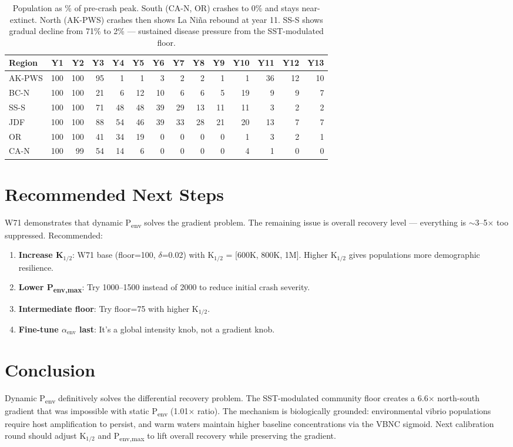 \documentclass[11pt]{article}
\begin{document}
\begin{table}[H]
\centering
\small
\begin{tabular}{l|rrrrrrrrrrrrr}
\toprule
Region & Y1 & Y2 & Y3 & Y4 & Y5 & Y6 & Y7 & Y8 & Y9 & Y10 & Y11 & Y12 & Y13 \\
\midrule
AK-PWS & 100 & 100 & 95 & 1 & 1 & 3 & 2 & 2 & 1 & 1 & 36 & 12 & 10 \\
BC-N & 100 & 100 & 21 & 6 & 12 & 10 & 6 & 6 & 5 & 19 & 9 & 9 & 7 \\
SS-S & 100 & 100 & 71 & 48 & 48 & 39 & 29 & 13 & 11 & 11 & 3 & 2 & 2 \\
JDF & 100 & 100 & 88 & 54 & 46 & 39 & 33 & 28 & 21 & 20 & 13 & 7 & 7 \\
OR & 100 & 100 & 41 & 34 & 19 & 0 & 0 & 0 & 0 & 1 & 3 & 2 & 1 \\
CA-N & 100 & 99 & 54 & 14 & 6 & 0 & 0 & 0 & 0 & 4 & 1 & 0 & 0 \\
\bottomrule
\end{tabular}
\caption{Population as \% of pre-crash peak. South (CA-N, OR) crashes to 0\% and stays near-extinct. North (AK-PWS) crashes then shows La Ni\~na rebound at year 11. SS-S shows gradual decline from 71\% to 2\% --- sustained disease pressure from the SST-modulated floor.}
\end{table}

\section{Recommended Next Steps}

W71 demonstrates that dynamic P\textsubscript{env} solves the gradient problem. The remaining issue is overall recovery level --- everything is $\sim$3--5$\times$ too suppressed. Recommended:

\begin{enumerate}
    \item \textbf{Increase K$_{1/2}$}: W71 base (floor=100, $\delta$=0.02) with K$_{1/2}$ = [600K, 800K, 1M]. Higher K$_{1/2}$ gives populations more demographic resilience.
    \item \textbf{Lower P\textsubscript{env,max}}: Try 1000--1500 instead of 2000 to reduce initial crash severity.
    \item \textbf{Intermediate floor}: Try floor=75 with higher K$_{1/2}$.
    \item \textbf{Fine-tune $\alpha_\text{env}$ last}: It's a global intensity knob, not a gradient knob.
\end{enumerate}

\section{Conclusion}

Dynamic P\textsubscript{env} definitively solves the differential recovery problem. The SST-modulated community floor creates a 6.6$\times$ north-south gradient that was impossible with static P\textsubscript{env} (1.01$\times$ ratio). The mechanism is biologically grounded: environmental vibrio populations require host amplification to persist, and warm waters maintain higher baseline concentrations via the VBNC sigmoid. Next calibration round should adjust K$_{1/2}$ and P\textsubscript{env,max} to lift overall recovery while preserving the gradient.
\end{document}
